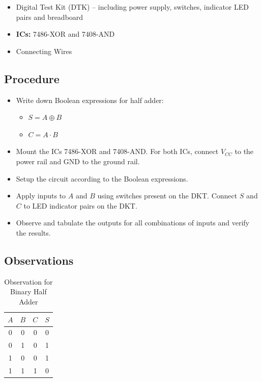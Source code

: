 \documentclass[11pt, a4paper]{article}
\begin{document}
\begin{itemize}
    \item Digital Test Kit (DTK) -- including power supply, switches, indicator LED pairs and breadboard
    \item \textbf{ICs:} 7486-XOR and 7408-AND
    \item Connecting Wires
\end{itemize}

\subsection{Procedure}

\begin{itemize}
    \item Write down Boolean expressions for half adder:
    \begin{itemize}[label=$\circ$]
        \item $S = A \oplus B$
        \item $C = A \cdot B$
    \end{itemize}
    \item Mount the ICs 7486-XOR and 7408-AND. For both ICs, connect $V_{CC}$ to the power rail and $\text{GND}$ to the ground rail.
    \item Setup the circuit according to the Boolean expressions.
    \item Apply inputs to $A$ and $B$ using switches present on the DKT. Connect $S$ and $C$ to LED indicator pairs on the DKT.
    \item Observe and tabulate the outputs for all combinations of inputs and verify the results.
\end{itemize}

\subsection{Observations}

\begin{table}[H]
    \centering
    \caption{Observation for Binary Half Adder}
    \begin{tabular}{|cc|cc|}
        \hline
        $A$ & $B$ & $C$ & $S$ \\
        \hline
        0 & 0 & 0 & 0 \\
        \hline
        0 & 1 & 0 & 1 \\
        \hline
        1 & 0 & 0 & 1 \\
        \hline
        1 & 1 & 1 & 0 \\
        \hline
    \end{tabular}
\end{table}
\end{document}

